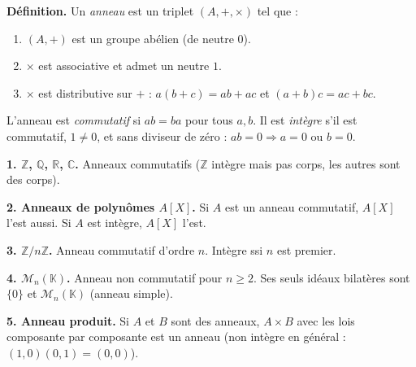﻿%



\begin{tcolorbox}[thmbox]
  \textbf{Définition.}\enspace%
  Un \emph{anneau} est un triplet $(A, +, \times)$ tel que :
  \begin{enumerate}
    \item[\textbf{A1.}] $(A, +)$ est un groupe abélien (de neutre $0$).
    \item[\textbf{A2.}] $\times$ est associative et admet un neutre $1$.
    \item[\textbf{A3.}] $\times$ est distributive sur $+$ :
          $a(b+c)=ab+ac$ et $(a+b)c=ac+bc$.
  \end{enumerate}
  L'anneau est \emph{commutatif} si $ab = ba$ pour tous $a, b$.
  Il est \emph{intègre} s'il est commutatif, $1 \neq 0$, et sans diviseur de zéro :
  $ab = 0 \Rightarrow a = 0$ ou $b = 0$.
\end{tcolorbox}


\begin{mdframed}[style=exbar]
  \textbf{1. $\mathbb{Z}$, $\mathbb{Q}$, $\mathbb{R}$, $\mathbb{C}$.}\enspace%
  Anneaux commutatifs ($\mathbb{Z}$ intègre mais pas corps, les autres sont des corps).

  \smallskip\noindent
  \textbf{2. Anneaux de polynômes $A[X]$.}\enspace%
  Si $A$ est un anneau commutatif, $A[X]$ l'est aussi.
  Si $A$ est intègre, $A[X]$ l'est.

  \smallskip\noindent
  \textbf{3. $\mathbb{Z}/n\mathbb{Z}$.}\enspace%
  Anneau commutatif d'ordre $n$. Intègre ssi $n$ est premier.

  \smallskip\noindent
  \textbf{4. $\mathcal{M}_n(\mathbb{K})$.}\enspace%
  Anneau non commutatif pour $n \geq 2$. Ses seuls idéaux bilatères sont $\{0\}$ et
  $\mathcal{M}_n(\mathbb{K})$ (anneau simple).

  \smallskip\noindent
  \textbf{5. Anneau produit.}\enspace%
  Si $A$ et $B$ sont des anneaux, $A \times B$ avec les lois composante par composante
  est un anneau (non intègre en général : $(1,0)(0,1)=(0,0)$).
\end{mdframed}

